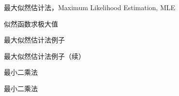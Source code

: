 
\begin{frame}

\begin{block}{最大似然估计法，Maximum Likelihood Estimation, MLE}

\end{block}

\end{frame}


\begin{frame}

\begin{block}{似然函数求极大值}

\end{block}

\end{frame}


\begin{frame}

\begin{block}{最大似然估计法例子}

\end{block}

\end{frame}


\begin{frame}

\begin{block}{最大似然估计法例子（续）}

\end{block}

\end{frame}


\begin{frame}

\begin{block}{最小二乘法}

\end{block}

\end{frame}


\begin{frame}

\begin{block}{最小二乘法}

\end{block}

\end{frame}


